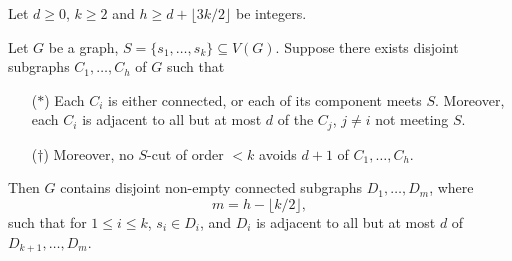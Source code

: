 \documentclass[a4paper]{article}
\begin{document}
\begin{lemma}
  Let $d \geq 0$, $k \geq 2$ and $h \geq d + \lfloor 3k/2 \rfloor$ be integers.

  Let $G$ be a graph, $S= \{s_1, \ldots, s_k\} \subseteq V(G)$. Suppose there exists disjoint subgraphs $C_1, \ldots, C_h$ of $G$ such that
  \begin{itemize}
    \item[($*$)] Each $C_i$ is either connected, or each of its component meets $S$. Moreover, each $C_i$ is adjacent to all but at most $d$ of the $C_j$, $j \not= i$ not meeting $S$.
    \item[($\dagger$)] Moreover, no $S$-cut of order $< k$ avoids $d + 1$ of $C_1, \ldots, C_h$.
  \end{itemize}
  Then $G$ contains disjoint non-empty connected subgraphs $D_1, \ldots, D_m$, where
  \[
    m = h - \lfloor k/2 \rfloor,
  \]
  such that for $1 \leq i \leq k$, $s_i \in D_i$, and $D_i$ is adjacent to all but at most $d$ of $D_{k + 1}, \ldots, D_m$.
\end{lemma}
\end{document}
